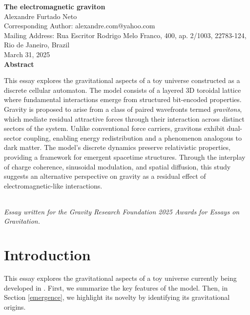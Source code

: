 \documentclass[12pt]{article}
\begin{document}
\begin{titlepage}
    \centering
    \vspace*{1in}
    
    {\LARGE \textbf{The electromagnetic graviton}}\\[1.5cm]
    
    {\large Alexandre Furtado Neto}\\[0.5cm]
    {Corresponding Author: alexandre.com@yahoo.com}\\
    {Mailing Address: Rua Escritor Rodrigo Melo Franco, 400, ap. 2/1003, 22783-124, Rio de Janeiro, Brazil}\\[1.5cm]
    
    {\large March 31, 2025}\\[1.5cm]
    
    \textbf{Abstract}\\[0.5cm]
    \begin{minipage}{0.9\textwidth}
        \small
This essay explores the gravitational aspects of a toy universe constructed as a discrete cellular automaton. The model consists of a layered 3D toroidal lattice where fundamental interactions emerge from structured bit-encoded properties. Gravity is proposed to arise from a class of paired wavefronts termed \textit{gravitons}, which mediate residual attractive forces through their interaction across distinct sectors of the system. Unlike conventional force carriers, gravitons exhibit dual-sector coupling, enabling energy redistribution and a phenomenon analogous to dark matter. The model's discrete dynamics preserve relativistic properties, providing a framework for emergent spacetime structures. Through the interplay of charge coherence, sinusoidal modulation, and spatial diffusion, this study suggests an alternative perspective on gravity as a residual effect of electromagnetic-like interactions.
    \end{minipage}\\[1.5cm]
    
    \textit{Essay written for the Gravity Research Foundation 2025 Awards for Essays on Gravitation.}
\end{titlepage}   

\section{Introduction}
This essay explores the gravitational aspects of a toy universe currently being developed in \cite{ResearchGate}. First, we summarize the key features of the model. Then, in Section \ref{emergence}, we highlight its novelty by identifying its gravitational origins.
\end{document}
